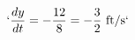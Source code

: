 \documentclass[preview]{standalone}
\begin{document}
\begin{align*}
`\frac{dy}{dt} = -\frac{12}{8} = -\frac{3}{2} \text{ ft/s}`
\end{align*}
\end{document}
